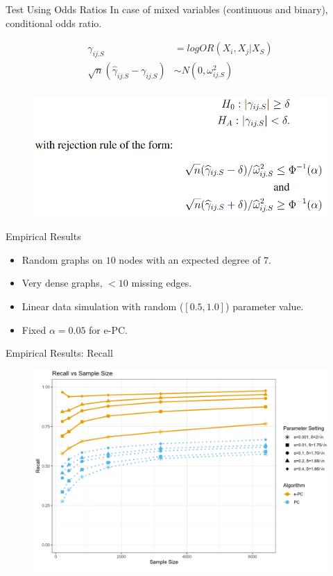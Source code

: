 \documentclass{beamer}
\begin{document}
\begin{frame}{Test Using Odds Ratios}
	In case of mixed variables (continuous and binary), conditional odds ratio.

	\begin{equation*}
		\begin{split}
			\gamma_{ij.S} &= log OR(X_i, X_j \rvert X_S) \\
			\sqrt{n}(\hat{\gamma}_{ij.S} - \gamma_{ij.S}) &\sim N(0, \omega^2_{ij.S}) \\
		\end{split}
	\end{equation*}
	\begin{figure}
		\centering
		\includegraphics[scale=0.35]{imgs/test3.png}
	\end{figure}
\end{frame}

\begin{frame}{Empirical Results}
	\begin{itemize}
		\item Random graphs on $ 10 $ nodes with an expected degree of $ 7 $.
		\item Very dense graphs, $ < 10 $ missing edges.
		\item Linear data simulation with random ($ [0.5, 1.0] $) parameter value.
		\item Fixed $ \alpha = 0.05 $ for e-PC.
	\end{itemize}
\end{frame}

\begin{frame}{Empirical Results: Recall}
	\begin{figure}
		\centering
		\includegraphics[scale=0.2]{imgs/recall.png}
	\end{figure}
\end{frame}
\end{document}
